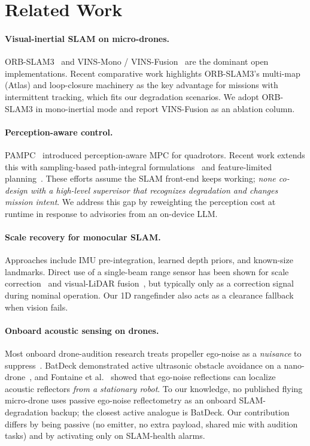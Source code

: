 \section{Related Work}
\label{sec:related}

\paragraph{Visual-inertial SLAM on micro-drones.}
ORB-SLAM3~\cite{campos2021orbslam3} and VINS-Mono / VINS-Fusion~\cite{qin2018vinsmono}
are the dominant open implementations. Recent comparative work
\cite{merzlyakov2021vslam,schmidt2025vislamloop} highlights ORB-SLAM3's
multi-map (Atlas) and loop-closure machinery as the key advantage for
missions with intermittent tracking, which fits our degradation
scenarios. We adopt ORB-SLAM3 in mono-inertial mode and report
VINS-Fusion as an ablation column.

\paragraph{Perception-aware control.}
PAMPC~\cite{falanga2018pampc} introduced perception-aware MPC for
quadrotors. Recent work extends this with sampling-based path-integral
formulations~\cite{pampi2025} and feature-limited
planning~\cite{paplanning2025}. These efforts assume the SLAM
front-end keeps working; \emph{none co-design with a high-level
supervisor that recognizes degradation and changes mission intent}.
We address this gap by reweighting the perception cost at runtime in
response to advisories from an on-device LLM.

\paragraph{Scale recovery for monocular SLAM.}
Approaches include IMU pre-integration, learned depth priors, and
known-size landmarks. Direct use of a single-beam range sensor has
been shown for scale correction~\cite{zhang2018rangefinderscale} and
visual-LiDAR fusion~\cite{vlidaroscale2023}, but typically only as a
correction signal during nominal operation. Our 1D rangefinder also
acts as a clearance fallback when vision fails.

\paragraph{Onboard acoustic sensing on drones.}
Most onboard drone-audition research treats propeller ego-noise as a
\emph{nuisance} to suppress~\cite{rotorconditioned2025}. BatDeck
demonstrated active ultrasonic obstacle avoidance on a
nano-drone~\cite{batdeck2024}, and Fontaine et al.~\cite{fontaine2021}
showed that ego-noise reflections can localize acoustic reflectors
\emph{from a stationary robot}. To our knowledge, no published flying
micro-drone uses passive ego-noise reflectometry as an onboard
SLAM-degradation backup; the closest active analogue is BatDeck. Our
contribution differs by being passive (no emitter, no extra payload,
shared mic with audition tasks) and by activating only on SLAM-health
alarms.

